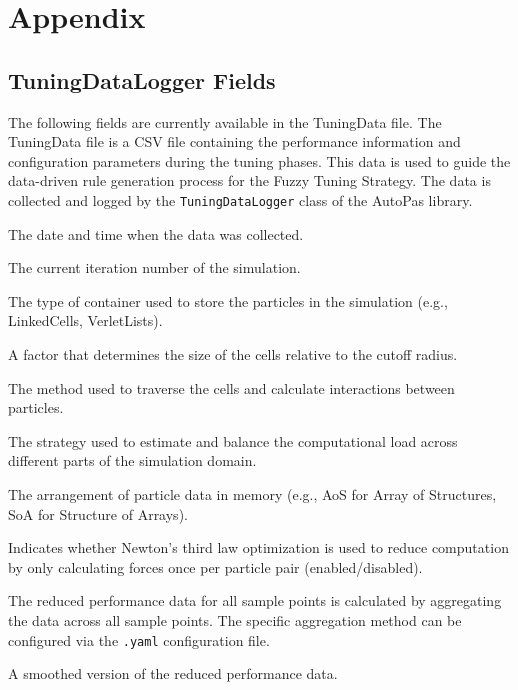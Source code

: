 \chapter{Appendix}

\section{TuningDataLogger Fields}
\label{des:tuningdatafields}

The following fields are currently available in the TuningData file.
The TuningData file is a CSV file containing the performance information and configuration parameters during the tuning phases. This data is used to guide the data-driven rule generation process for the Fuzzy Tuning Strategy. The data is collected and logged by the \texttt{TuningDataLogger} class of the AutoPas library.

\begin{description}[style=multiline, leftmargin =40mm]
  \item[Date] The date and time when the data was collected.
  \item[Iteration] The current iteration number of the simulation.
  \item[Container] The type of container used to store the particles in the simulation (e.g., LinkedCells, VerletLists).
  \item[CellSizeFactor] A factor that determines the size of the cells relative to the cutoff radius.
  \item[Traversal] The method used to traverse the cells and calculate interactions between particles.
  \item[Load Estimator] The strategy used to estimate and balance the computational load across different parts of the simulation domain.
  \item[Data Layout] The arrangement of particle data in memory (e.g., AoS for Array of Structures, SoA for Structure of Arrays).
  \item[Newton 3] Indicates whether Newton's third law optimization is used to reduce computation by only calculating forces once per particle pair (enabled/disabled).
  \item[Reduced] The reduced performance data for all sample points is calculated by aggregating the data across all sample points. The specific aggregation method can be configured via the \texttt{.yaml} configuration file.
  \item[Smoothed] A smoothed version of the reduced performance data.

\end{description}

